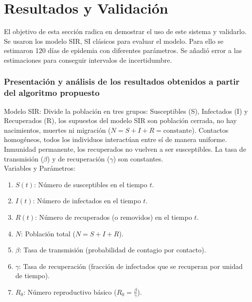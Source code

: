 \chapter{Resultados y Validación}\label{chapter:resultsValidation}
\label{sec:17}

    El objetivo de esta sección radica en demostrar el uso de este sistema y validarlo. Se usaron los modelo SIR, SI clásicos para evaluar el modelo. Para ello se estimaron 120 días
     de epidemia con diferentes parámetros. Se añadió error a las estimaciones para conseguir intervalos de incertidumbre. \\

        \subsection*{Presentación y análisis de los resultados obtenidos a partir del algoritmo propuesto}  

        Modelo SIR: Divide la población en tres grupos: Susceptibles (S), Infectados (I) y Recuperados (R), los supuestos del modelo SIR son población cerrada, no hay 
        nacimientos, muertes ni migración (\(N = S + I + R = \text{constante}\)). Contactos homogéneos, todos los individuos interactúan entre sí de manera uniforme. 
        Inmunidad permanente, los recuperados no vuelven a ser susceptibles. La tasa de transmisión (\(\beta\)) y de recuperación (\(\gamma\)) 
        son constantes. \\
        
        Variables y Parámetros:
        \begin{enumerate}
            
            \item \(S(t)\): Número de susceptibles en el tiempo \(t\).
            \item \(I(t)\): Número de infectados en el tiempo \(t\).
            \item \(R(t)\): Número de recuperados (o removidos) en el tiempo \(t\).
            \item \(N\): Población total (\(N = S + I + R\)).
            \item \(\beta\): Tasa de transmisión (probabilidad de contagio por contacto).
            \item \(\gamma\): Tasa de recuperación (fracción de infectados que se recuperan por unidad de tiempo).
            \item \(R_0\): Número reproductivo básico (\(R_0 = \frac{\beta}{\gamma}\)). \\
        \end{enumerate}

